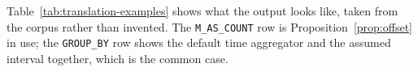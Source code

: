 \begin{table}[htbp]\centering\scriptsize

\caption{Worked translations, each the shortest corpus query exercising that feature.
Long expressions are truncated.}
\label{tab:translation-examples}
\end{table}

\noindent
Table~\ref{tab:translation-examples} shows what the output looks like, taken from the
corpus rather than invented. The \texttt{M\_AS\_COUNT} row is Proposition~\ref{prop:offset}
in use; the \texttt{GROUP\_BY} row shows the default time aggregator and the assumed
interval together, which is the common case.
